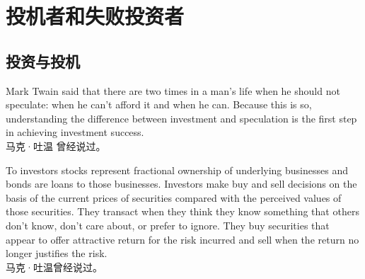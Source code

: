 \chapter{投机者和失败投资者}
\section{投资与投机}

\begin{verseparallel}
  {
    \noindent Mark Twain said that there are two times in a man's life when he
    should not speculate: when he can't afford it and when he can. Because this
    is so, understanding the difference between investment and speculation is
    the first step in achieving investment success. \\
  }
  {
    马克·吐温\footnotemark{} 曾经说过。
  }
\end{verseparallel}

\begin{verseparallel}
  {
    To investors stocks represent fractional ownership of underlying businesses
    and bonds are loans to those businesses. Investors make buy and sell
    decisions on the basis of the current prices of securities compared with the
    perceived values of those securities. They transact when they think they
    know something that others don't know, don't care about, or prefer to
    ignore. They buy securities that appear to offer attractive return for the
    risk incurred and sell when the return no longer justifies the risk. \\
  }
  {
    马克·吐温曾经说过。
  }
\end{verseparallel}

